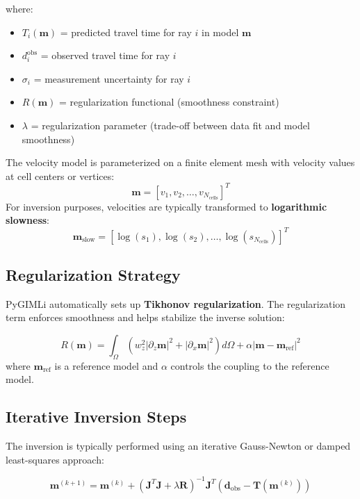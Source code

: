 where:
\begin{itemize}
    \item $T_i(\mathbf{m})$ = predicted travel time for ray $i$ in model $\mathbf{m}$
    \item $d_i^{\text{obs}}$ = observed travel time for ray $i$
    \item $\sigma_i$ = measurement uncertainty for ray $i$
    \item $R(\mathbf{m})$ = regularization functional (smoothness constraint)
    \item $\lambda$ = regularization parameter (trade-off between data fit and model smoothness)
\end{itemize}
The velocity model is parameterized on a finite element mesh with velocity values at cell centers or vertices:
\begin{equation}
\mathbf{m} = [v_1, v_2, \ldots, v_{N_{\text{cells}}}]^T
\end{equation}
For inversion purposes, velocities are typically transformed to \textbf{logarithmic slowness}:
\begin{equation}
\mathbf{m}_{\text{slow}} = [\log(s_1), \log(s_2), \ldots, \log(s_{N_{\text{cells}}})]^T
\end{equation}

\subsection*{Regularization Strategy}

PyGIMLi automatically sets up \textbf{Tikhonov regularization}. The regularization term enforces smoothness and helps stabilize the inverse solution:

\begin{equation}
R(\mathbf{m}) = \int_{\Omega} \left( w_z^2 |\partial_z \mathbf{m}|^2 + |\partial_x \mathbf{m}|^2 \right) d\Omega + \alpha |\mathbf{m} - \mathbf{m}_{\text{ref}}|^2
\end{equation}
where $\mathbf{m}_{\text{ref}}$ is a reference model and $\alpha$ controls the coupling to the reference model.

\subsection*{Iterative Inversion Steps}

The inversion is typically performed using an iterative Gauss-Newton or damped least-squares approach:

\begin{equation}
\mathbf{m}^{(k+1)} = \mathbf{m}^{(k)} + \left( \mathbf{J}^T \mathbf{J} + \lambda \mathbf{R} \right)^{-1} \mathbf{J}^T \left( \mathbf{d}_{\text{obs}} - \mathbf{T}(\mathbf{m}^{(k)}) \right)
\end{equation}

